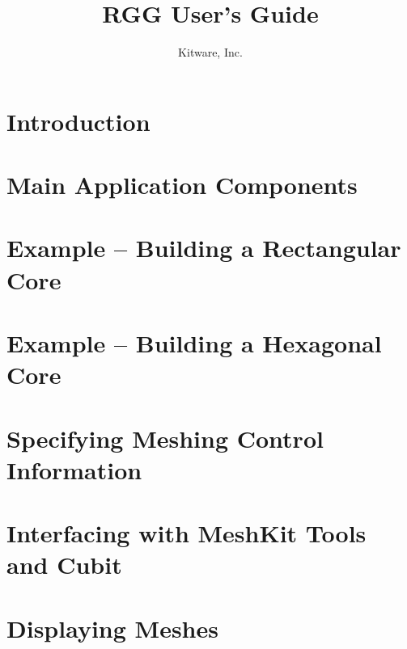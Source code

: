 \documentclass[letterpaper,10pt,draft]{book}
\title{RGG User's Guide}
\author{Kitware, Inc.}
\begin{document}
\maketitle
\tableofcontents

\chapter{Introduction}
\label{chapter:Introduction}


\chapter{Main Application Components}
\label{chapter:Main Application Components}


\chapter{Example -- Building a Rectangular Core}
\label{chapter:Example -- Building a Rectangular Core}
%

\chapter{Example -- Building a Hexagonal Core}
\label{chapter:Example -- Building a Hexagonal Core}
%

\chapter{Specifying Meshing Control Information}
\label{chapter:Specifying Meshing Control Information}


\chapter{Interfacing with MeshKit Tools and Cubit}
\label{chapter:Interfacing with MeshKit Tools and Cubit}


\chapter{Displaying Meshes}
\label{chapter:Displaying Meshes}

\end{document}
